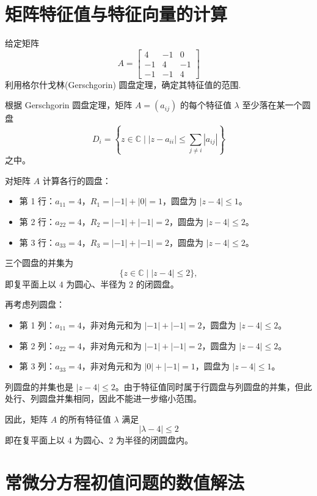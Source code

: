 \documentclass[lang=cn,newtx,12pt,scheme=chinese]{elegantbook}
\begin{document}
\chapter{矩阵特征值与特征向量的计算}
\begin{exercise}
	给定矩阵
\[
A = \begin{bmatrix}
	4 & -1 & 0 \\
	-1 & 4 & -1 \\
	-1 & -1 & 4
\end{bmatrix}
\]
	利用格尔什戈林(Gerschgorin) 圆盘定理，确定其特征值的范围.
\end{exercise}
\begin{solution}
	根据 Gerschgorin 圆盘定理，矩阵 $A = (a_{ij})$ 的每个特征值 $\lambda$ 至少落在某一个圆盘
	\[
	D_i = \left\{ z \in \mathbb{C} \mid |z - a_{ii}| \le \sum_{j \neq i} |a_{ij}| \right\}
	\]
	之中。
	
	对矩阵 $A$ 计算各行的圆盘：
	
	\begin{itemize}
		\item 第 1 行：$a_{11} = 4$，$R_1 = |-1| + |0| = 1$，圆盘为 $|z - 4| \le 1$。
		\item 第 2 行：$a_{22} = 4$，$R_2 = |-1| + |-1| = 2$，圆盘为 $|z - 4| \le 2$。
		\item 第 3 行：$a_{33} = 4$，$R_3 = |-1| + |-1| = 2$，圆盘为 $|z - 4| \le 2$。
	\end{itemize}
	
	三个圆盘的并集为
	\[
	\{ z \in \mathbb{C} \mid |z - 4| \le 2 \},
	\]
	即复平面上以 $4$ 为圆心、半径为 $2$ 的闭圆盘。
	
	再考虑列圆盘：
	\begin{itemize}
		\item 第 1 列：$a_{11} = 4$，非对角元和为 $|-1| + |-1| = 2$，圆盘为 $|z - 4| \le 2$。
		\item 第 2 列：$a_{22} = 4$，非对角元和为 $|-1| + |-1| = 2$，圆盘为 $|z - 4| \le 2$。
		\item 第 3 列：$a_{33} = 4$，非对角元和为 $|0| + |-1| = 1$，圆盘为 $|z - 4| \le 1$。
	\end{itemize}
	
	列圆盘的并集也是 $|z - 4| \le 2$。由于特征值同时属于行圆盘与列圆盘的并集，但此处行、列圆盘并集相同，因此不能进一步缩小范围。
	
	因此，矩阵 $A$ 的所有特征值 $\lambda$ 满足
	\[
	\boxed{|\lambda - 4| \le 2}
	\]
	即在复平面上以 $4$ 为圆心、$2$ 为半径的闭圆盘内。
\end{solution}
\chapter{常微分方程初值问题的数值解法}
\end{document}
